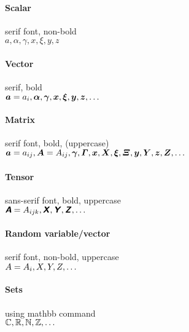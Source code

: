 \documentclass{article}
\begin{document}
	\paragraph{Scalar} serif font, non-bold \\
	$a, \alpha, \gamma, x, \xi, y, z $
	\paragraph{Vector} serif, bold \\
	$\bm{a} = a_i, \bm{\alpha}, \bm{\gamma},  \bm{x}, \bm{\xi}, \bm{y}, \bm{z}, \dots$
	
	\paragraph{Matrix} serif font, bold, (uppercase) \\
	$\bm{a} = a_{ij}, \bm{A} = A_{ij} , \bm{\gamma}, \bm{\varGamma}, \bm{x}, \bm{X},  \bm{\xi},  \bm{\varXi}, \bm{y}, \bm{Y},  \bm{z}, \bm{Z}, \dots$
		
	\paragraph{Tensor} sans-serif font, bold, uppercase \\
	$\textsf{\textbf{\textsl{A}}} = A_{ijk}, \textsf{\textbf{\textsl{X}}}, \textsf{\textbf{\textsl{Y}}}, \textsf{\textbf{\textsl{Z}}}, \dots $	
	
	\paragraph{Random variable/vector} serif font, non-bold, uppercase \\
	$A = A_{i}, X, Y, Z, \dots $			
	
	\paragraph{Sets} using mathbb command\\
	$ \mathbb{C}, \mathbb{R}, \mathbb{N}, \mathbb{Z}, \dots $	
	
\end{document}
